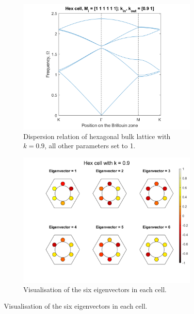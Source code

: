 \begin{figure}
\centering
\begin{subfigure}[b]{.5\textwidth}
  \centering
  \includegraphics[width=1\linewidth]{imgs/hexinvdisperless.png}
  \caption{Dispersion relation of hexagonal bulk lattice with $k=0.9$, all
other parameters set to 1.}
  \label{fig:sub1}
\end{subfigure}%
\begin{subfigure}[b]{.5\textwidth}
  \centering
  \includegraphics[width=1\linewidth]{imgs/hexinversionless.png}
  \caption{Visualisation of the six eigenvectors in each cell.}
  \label{fig:sub2}
\end{subfigure}


\end{figure}
